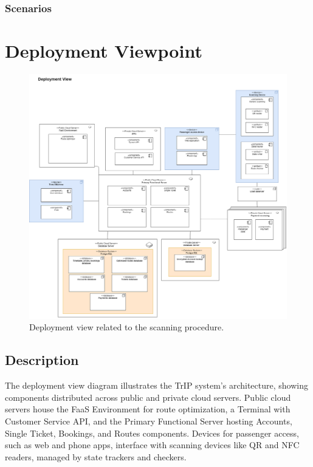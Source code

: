 \subsubsection{Scenarios}


\section{Deployment Viewpoint}

\begin{figure}[H]
    \centering
    \includegraphics[width=\textwidth]{drawings/views_final_version/deployment_view.png}
    \caption{Deployment view related to the scanning procedure.}
    \label{fig:deployment_view_scanning}
\end{figure}

\subsection*{Description}
The deployment view diagram illustrates the TrIP system's architecture, showing components distributed across public and private cloud servers. Public cloud servers house the FaaS Environment for route optimization, a Terminal with Customer Service API, and the Primary Functional Server hosting Accounts, Single Ticket, Bookings, and Routes components. Devices for passenger access, such as web and phone apps, interface with scanning devices like QR and NFC readers, managed by state trackers and checkers.


